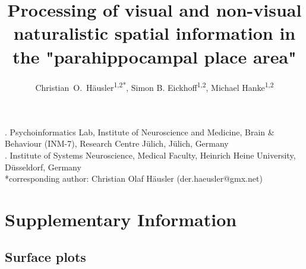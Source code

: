 \documentclass[english,11pt]{article}
\begin{document}




\title{Processing of visual and non-visual naturalistic spatial information in
  the "parahippocampal place area"}

\author{
    Christian~O.~Häusler\textsuperscript{1,2{*}},
    Simon B. Eickhoff\textsuperscript{1,2},
    Michael Hanke\textsuperscript{1,2}}

\maketitle
\thispagestyle{fancy}

. Psychoinformatics Lab, Institute of Neuroscience and Medicine, Brain \&
Behaviour (INM-7), Research Centre Jülich, Jülich, Germany\\
. Institute of Systems Neuroscience, Medical Faculty, Heinrich Heine University,
Düsseldorf, Germany\\
{*}corresponding author: Christian Olaf Häusler (der.haeusler@gmx.net)



\listoffigures

\pagebreak[4]


\section*{Supplementary Information}

\subsection*{Surface plots}
\end{document}
